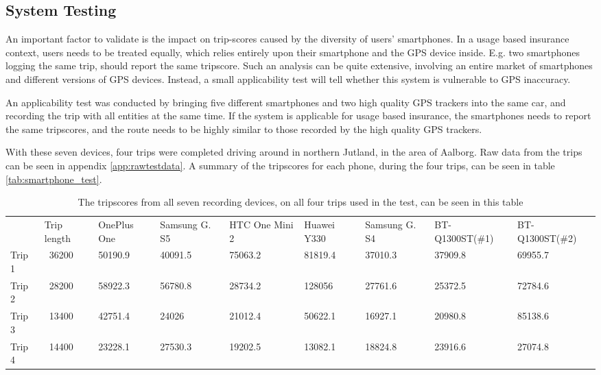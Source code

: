 \subsection{System Testing}\label{subsec:systemtesting}
An important factor to validate is the impact on trip-scores caused by the diversity of users' smartphones. In a usage based insurance context, users needs to be treated equally, which relies entirely upon their smartphone and the GPS device inside. E.g. two smartphones logging the same trip, should report the same tripscore. Such an analysis can be quite extensive, involving an entire market of smartphones and different versions of GPS devices. Instead, a small applicability test will tell whether this system is vulnerable to GPS inaccuracy. 

An applicability test was conducted by bringing five different smartphones and two high quality GPS trackers into the same car, and recording the trip with all entities at the same time. If the system is applicable for usage based insurance, the smartphones needs to report the same tripscores, and the route needs to be highly similar to those recorded by the high quality GPS trackers. 

With these seven devices, four trips were completed driving around in northern Jutland, in the area of Aalborg. Raw data from the trips can be seen in appendix \ref{app:rawtestdata}. A summary of the tripscores for each phone, during the four trips, can be seen in table \ref{tab:smartphone_test}.

\begin{table*}[tb]
\centering
\caption{The tripscores from all seven recording devices, on all four trips used in the test, can be seen in this table}
\label{tab:smartphone_test_one}
\begin{tabular}{lllllllll}
       & Trip length & OnePlus One & Samsung G. S5 & HTC One Mini 2 & Huawei Y330 & Samsung G. S4 & BT-Q1300ST(\#1) & BT-Q1300ST(\#2) \\
Trip 1 & ~36200 & 50190.9     & 40091.5       & 75063.2        & 81819.4 & 37010.3       & 37909.8         & 69955.7         \\
Trip 2 & ~28200 & 58922.3     & 56780.8       & 28734.2        & 128056  & 27761.6       & 25372.5         & 72784.6         \\
Trip 3 & ~13400 & 42751.4     & 24026         & 21012.4        & 50622.1 & 16927.1       & 20980.8         & 85138.6         \\
Trip 4 & ~14400 & 23228.1     & 27530.3       & 19202.5        & 13082.1 & 18824.8       & 23916.6         & 27074.8        
\end{tabular}
\end{table*}

